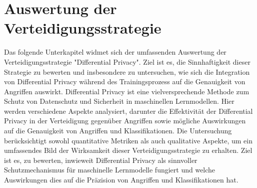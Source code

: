 \section{Auswertung der Verteidigungsstrategie}
Das folgende Unterkapitel widmet sich der umfassenden Auswertung der Verteidigungsstrategie "Differential Privacy". Ziel ist es, die Sinnhaftigkeit dieser Strategie zu bewerten und insbesondere zu untersuchen, wie sich die Integration von Differential Privacy während des Trainingsprozess auf die Genauigkeit von Angriffen auswirkt. Differential Privacy ist eine vielversprechende Methode zum Schutz von Datenschutz und Sicherheit in maschinellen Lernmodellen. Hier werden verschiedene Aspekte analysiert, darunter die Effektivität der Differential Privacy in der Verteidigung gegenüber Angriffen sowie mögliche Auswirkungen auf die Genauigkeit von Angriffen und Klassifikationen. Die Untersuchung berücksichtigt sowohl quantitative Metriken als auch qualitative Aspekte, um ein umfassendes Bild der Wirksamkeit dieser Verteidigungsstrategie zu erhalten. Ziel ist es, zu bewerten, inwieweit Differential Privacy als sinnvoller Schutzmechanismus für maschinelle Lernmodelle fungiert und welche Auswirkungen dies auf die Präzision von Angriffen und Klassifikationen hat.


